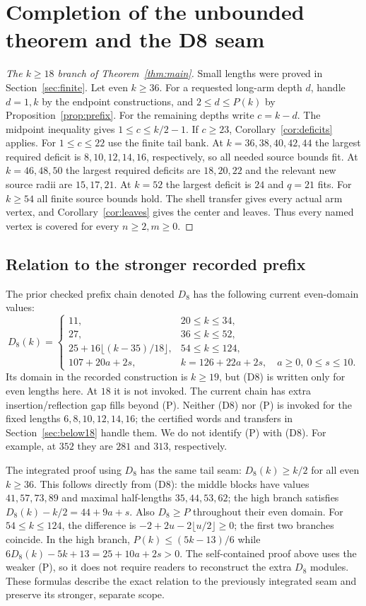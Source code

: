 \documentclass[11pt,a4paper]{article}
\theoremstyle{definition}\newtheorem{definition}[theorem]{Definition}
\theoremstyle{remark}\newtheorem{remark}[theorem]{Remark}
\begin{document}
\section{Completion of the unbounded theorem and the D8 seam}
\label{sec:d8}
\begin{proof}[The $k\ge18$ branch of Theorem~\ref{thm:main}]
Small lengths were proved in Section~\ref{sec:finite}. Let even $k\ge36$.
For a requested long-arm depth $d$, handle $d=1,k$ by the endpoint
constructions, and $2\le d\le P(k)$ by Proposition~\ref{prop:prefix}.
For the remaining depths write $c=k-d$. The midpoint inequality gives
$1\le c\le k/2-1$. If $c\ge23$, Corollary~\ref{cor:deficits} applies.
For $1\le c\le22$ use the finite tail bank. At $k=36,38,40,42,44$
the largest required deficit is $8,10,12,14,16$, respectively, so all
needed source bounds fit. At $k=46,48,50$ the largest required deficits
are $18,20,22$ and the relevant new source radii are $15,17,21$.
At $k=52$ the largest deficit is $24$ and $q=21$ fits. For $k\ge54$
all finite source bounds hold. The shell transfer gives every actual
arm vertex, and Corollary~\ref{cor:leaves} gives the center and leaves.
Thus every named vertex is covered for every $n\ge2,m\ge0$.
\end{proof}

\subsection{Relation to the stronger recorded prefix}
The prior checked prefix chain denoted $D_8$ has the following current
even-domain values:
\[
 D_8(k)=\begin{cases}
 11,&20\le k\le34,\\
 27,&36\le k\le52,\\
 25+16\lfloor(k-35)/18\rfloor,&54\le k\le124,\\
 107+20a+2s,&k=126+22a+2s,\quad a\ge0,\ 0\le s\le10.
 \end{cases}                                           \tag{D8}
\]
Its domain in the recorded construction is $k\ge19$, but (D8) is
written only for even lengths here. At $18$ it is not invoked.
The current chain has extra insertion/reflection gap fills beyond (P).
Neither (D8) nor (P) is invoked for the fixed lengths $6,8,10,12,14,16$;
the certified words and transfers in Section~\ref{sec:below18} handle them.
We do not identify (P) with (D8). For example, at $352$ they are
$281$ and $313$, respectively.

The integrated proof using $D_8$ has the same tail seam:
$D_8(k)\ge k/2$ for all even $k\ge36$. This follows directly from
(D8): the middle blocks have values $41,57,73,89$ and maximal half-lengths
$35,44,53,62$; the high branch satisfies
$D_8(k)-k/2=44+9a+s$. Also $D_8\ge P$ throughout their even domain.
For $54\le k\le124$, the difference is
$-2+2u-2\lfloor u/2\rfloor\ge0$; the first two branches coincide.
In the high branch, $P(k)\le(5k-13)/6$ while
$6D_8(k)-5k+13=25+10a+2s>0$.
The self-contained proof above uses the weaker (P), so it does not require
readers to reconstruct the extra $D_8$ modules. These formulas describe
the exact relation to the previously integrated seam and preserve its
stronger, separate scope.
\end{document}
